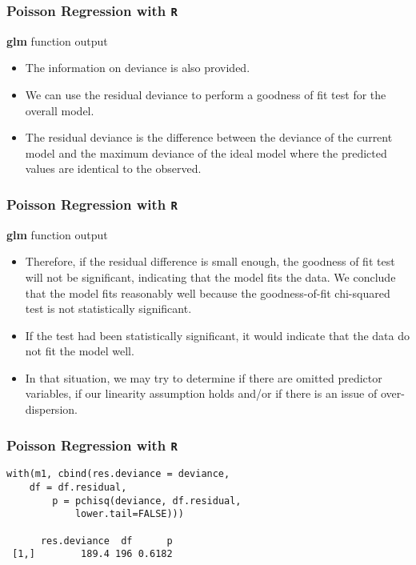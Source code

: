 \documentclass[00-GLMregslides.tex]{subfiles}
\begin{document}
\begin{frame}[fragile]
\frametitle{Poisson Regression with \texttt{R}}
\Large 
\textbf{glm} function output
\begin{itemize}
\item The information on deviance is also provided. 
\item We can use the residual deviance to perform a goodness of fit test for the overall model. 
\item The residual deviance is the difference between the deviance of the current model and the maximum deviance of the ideal model where the predicted values are identical to the observed. 
\end{itemize}
\end{frame}
\begin{frame}[fragile]
\frametitle{Poisson Regression with \texttt{R}}
\Large 
\textbf{glm} function output
\begin{itemize}
\item Therefore, if the residual difference is small enough, the goodness of fit test will not be significant, indicating that the model fits the data. We conclude that the model fits reasonably well because the goodness-of-fit chi-squared test is not statistically significant. 
\item If the test had been statistically significant, it would indicate that the data do not fit the model well. 
\item In that situation, we may try to determine if there are omitted predictor variables, if our linearity assumption holds and/or if there is an issue of over-dispersion. 
\end{itemize}
\end{frame}

\begin{frame}[fragile]

\frametitle{Poisson Regression with \texttt{R}}
\large

\begin{framed}
\begin{verbatim}
with(m1, cbind(res.deviance = deviance, 
	df = df.residual,
        p = pchisq(deviance, df.residual, 
            lower.tail=FALSE)))
 
      res.deviance  df      p
 [1,]        189.4 196 0.6182
\end{verbatim}
\end{framed}
\end{frame}
\end{document}
